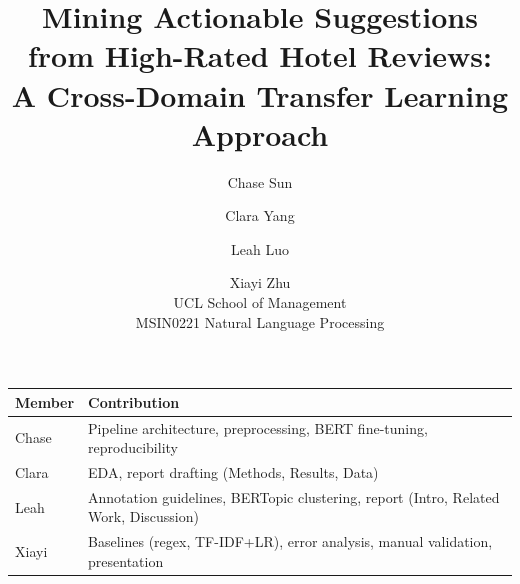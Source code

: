 \documentclass[11pt]{article}
\title{Mining Actionable Suggestions from High-Rated Hotel Reviews:\\A Cross-Domain Transfer Learning Approach}
\author{
  Chase Sun \and Clara Yang \and Leah Luo \and Xiayi Zhu \\
  UCL School of Management \\
  MSIN0221 Natural Language Processing}
\begin{document}
\maketitle

\begin{table}[t]
\centering\small
\begin{tabular}{lp{12cm}}
\toprule
\textbf{Member} & \textbf{Contribution} \\
\midrule
Chase & Pipeline architecture, preprocessing, BERT fine-tuning, reproducibility \\
Clara & EDA, report drafting (Methods, Results, Data) \\
Leah  & Annotation guidelines, BERTopic clustering, report (Intro, Related Work, Discussion) \\
Xiayi & Baselines (regex, TF-IDF+LR), error analysis, manual validation, presentation \\
\bottomrule
\end{tabular}
\end{table}












\appendix

\end{document}
